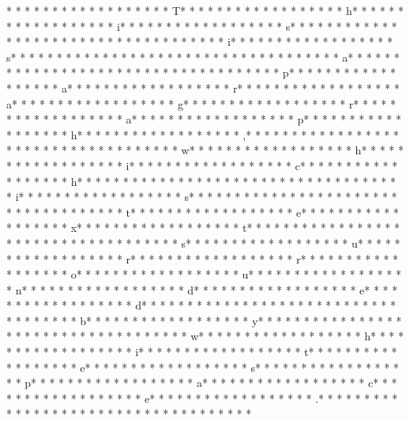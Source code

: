 * * *  * * *  * * *  *  * * *  *  * * *  * T* * *  * * *  * * *  *  * * *  *  * * *  * h* * *  * * *  * * *  *  * * *  *  * * *  * i* * *  * * *  * * *  *  * * *  *  * * *  * s* * *  * * *  * * *  *  * * *  *  * * *  *  * * *  * * *  * * *  *  * * *  *  * * *  * i* * *  * * *  * * *  *  * * *  *  * * *  * s* * *  * * *  * * *  *  * * *  *  * * *  *  * * *  * * *  * * *  *  * * *  *  * * *  * a* * *  * * *  * * *  *  * * *  *  * * *  *  * * *  * * *  * * *  *  * * *  *  * * *  * p* * *  * * *  * * *  *  * * *  *  * * *  * a* * *  * * *  * * *  *  * * *  *  * * *  * r* * *  * * *  * * *  *  * * *  *  * * *  * a* * *  * * *  * * *  *  * * *  *  * * *  * g* * *  * * *  * * *  *  * * *  *  * * *  * r* * *  * * *  * * *  *  * * *  *  * * *  * a* * *  * * *  * * *  *  * * *  *  * * *  * p* * *  * * *  * * *  *  * * *  *  * * *  * h* * *  * * *  * * *  *  * * *  *  * * *  * ,* * *  * * *  * * *  *  * * *  *  * * *  *  * * *  * * *  * * *  *  * * *  *  * * *  * w* * *  * * *  * * *  *  * * *  *  * * *  * h* * *  * * *  * * *  *  * * *  *  * * *  * i* * *  * * *  * * *  *  * * *  *  * * *  * c* * *  * * *  * * *  *  * * *  *  * * *  * h* * *  * * *  * * *  *  * * *  *  * * *  *  * * *  * * *  * * *  *  * * *  *  * * *  * i* * *  * * *  * * *  *  * * *  *  * * *  * s* * *  * * *  * * *  *  * * *  *  * * *  *  * * *  * * *  * * *  *  * * *  *  * * *  * t* * *  * * *  * * *  *  * * *  *  * * *  * e* * *  * * *  * * *  *  * * *  *  * * *  * x* * *  * * *  * * *  *  * * *  *  * * *  * t* * *  * * *  * * *  *  * * *  *  * * *  *  * * *  * * *  * * *  *  * * *  *  * * *  * s* * *  * * *  * * *  *  * * *  *  * * *  * u* * *  * * *  * * *  *  * * *  *  * * *  * r* * *  * * *  * * *  *  * * *  *  * * *  * r* * *  * * *  * * *  *  * * *  *  * * *  * o* * *  * * *  * * *  *  * * *  *  * * *  * u* * *  * * *  * * *  *  * * *  *  * * *  * n* * *  * * *  * * *  *  * * *  *  * * *  * d* * *  * * *  * * *  *  * * *  *  * * *  * e* * *  * * *  * * *  *  * * *  *  * * *  * d* * *  * * *  * * *  *  * * *  *  * * *  *  * * *  * * *  * * *  *  * * *  *  * * *  * b* * *  * * *  * * *  *  * * *  *  * * *  * y* * *  * * *  * * *  *  * * *  *  * * *  *  * * *  * * *  * * *  *  * * *  *  * * *  * w* * *  * * *  * * *  *  * * *  *  * * *  * h* * *  * * *  * * *  *  * * *  *  * * *  * i* * *  * * *  * * *  *  * * *  *  * * *  * t* * *  * * *  * * *  *  * * *  *  * * *  * e* * *  * * *  * * *  *  * * *  *  * * *  * s* * *  * * *  * * *  *  * * *  *  * * *  * p* * *  * * *  * * *  *  * * *  *  * * *  * a* * *  * * *  * * *  *  * * *  *  * * *  * c* * *  * * *  * * *  *  * * *  *  * * *  * e* * *  * * *  * * *  *  * * *  *  * * *  * .* * *  * * *  * * *  *  * * *  *  * * *  *  * * *  * * *  * * *  *  * * *  *  * * *  * 
